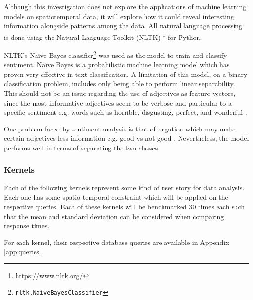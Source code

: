 Although this investigation does not explore the applications of machine learning models on spatiotemporal data, it will explore how it could reveal interesting information alongside patterns among the data. All natural language processing is done using the Natural Language Toolkit (NLTK)
\footnote{\url{https://www.nltk.org/}} for Python.

NLTK's Na\"ive Bayes classifier\footnote{\texttt{nltk.NaiveBayesClassifier}} was used as the model to train and classify sentiment. Na\"ive Bayes is a probabilistic machine learning model which has proven very effective in text classification. A limitation of this model, on a binary classification problem, includes only being able to perform linear separability. This should not be an issue regarding the use of adjectives as feature vectors, since the most informative adjectives seem to be verbose and particular to a specific sentiment e.g. words such as horrible, disgusting, perfect, and wonderful \cite{rish2001empirical}.

One problem faced by sentiment analysis is that of negation which may make certain adjectives less information e.g. good vs not good \cite{blanco2011some}. Nevertheless, the model performs well in terms of separating the two classes.

\subsubsection{Kernels}
\label{sec:kernels}

Each of the following kernels represent some kind of user story for data analysis. Each one has some spatio-temporal constraint which will be applied on the respective queries. Each of these kernels will be benchmarked 30 times each such that the mean and standard deviation can be considered when comparing response times. 

For each kernel, their respective database queries are available in Appendix \ref{app:queries}.




